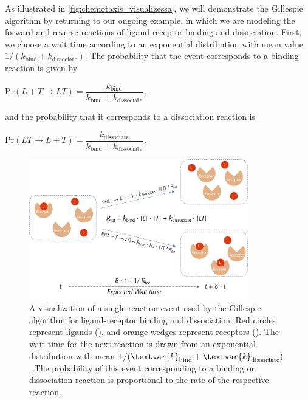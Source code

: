 \begin{qbox}\end{qbox}

As illustrated in \autoref{fig:chemotaxis_visualizessa}, we will demonstrate the Gillespie algorithm by returning to our ongoing example, in which we are modeling the forward and reverse reactions of ligand-receptor binding and dissociation. First, we choose a wait time according to an exponential distribution with mean value $1/(k_\text{bind} + k_\text{dissociate})$. The probability that the event corresponds to a binding reaction is given by

\begin{center}
$\mathrm{Pr}(L + T \rightarrow LT) = \dfrac{k_\text{bind}}{k_\text{bind} + k_\text{dissociate}}$\,,
\end{center}

\noindent and the probability that it corresponds to a dissociation reaction is

\begin{center}
$\mathrm{Pr}(LT \rightarrow L + T) = \dfrac{k_\text{dissociate}}{k_\text{bind} + k_\text{dissociate}}$\,.
\end{center}

\begin{figure}[h]
\centering
\mySfFamily
\includegraphics[width = 0.85\textwidth]{../images/chemotaxis_visualizessa.png}
\caption{A visualization of a single reaction event used by the Gillespie algorithm for ligand-receptor binding and dissociation. Red circles represent ligands (), and orange wedges represent receptors (). The wait time for the next reaction is drawn from an exponential distribution with mean $\text{1}/(\textvar{k}_\text{bind} + \textvar{k}_\text{dissociate})$. The probability of this event corresponding to a binding or dissociation reaction is proportional to the rate of the respective reaction.}
\label{fig:chemotaxis_visualizessa}
\end{figure}

